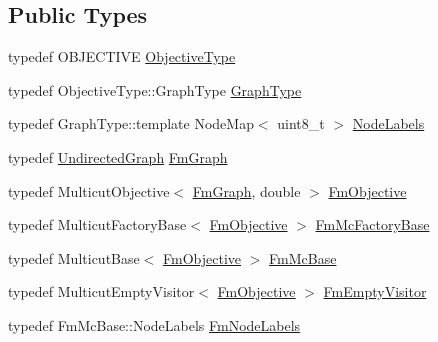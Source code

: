 \subsection*{Public Types}
\begin{DoxyCompactItemize}
\item 
typedef O\+B\+J\+E\+C\+T\+I\+VE \hyperlink{classnifty_1_1graph_1_1opt_1_1common_1_1FusionMove_a8e60c3d0397b2a2b49bdc8f302a65d93}{Objective\+Type}
\item 
typedef Objective\+Type\+::\+Graph\+Type \hyperlink{classnifty_1_1graph_1_1opt_1_1common_1_1FusionMove_ae7d9edd5e5e84cbe25b5732af4c71f93}{Graph\+Type}
\item 
typedef Graph\+Type\+::template Node\+Map$<$ uint8\+\_\+t $>$ \hyperlink{classnifty_1_1graph_1_1opt_1_1common_1_1FusionMove_a256feb2fca79a7cfc9cb82c561f97f64}{Node\+Labels}
\item 
typedef \hyperlink{classnifty_1_1graph_1_1UndirectedGraph}{Undirected\+Graph} \hyperlink{classnifty_1_1graph_1_1opt_1_1common_1_1FusionMove_a0117bf1dc4f03da949dea05ba953c78e}{Fm\+Graph}
\item 
typedef Multicut\+Objective$<$ \hyperlink{classnifty_1_1graph_1_1opt_1_1common_1_1FusionMove_a0117bf1dc4f03da949dea05ba953c78e}{Fm\+Graph}, double $>$ \hyperlink{classnifty_1_1graph_1_1opt_1_1common_1_1FusionMove_a238d47fabd4bf7f5a923885f9203536c}{Fm\+Objective}
\item 
typedef Multicut\+Factory\+Base$<$ \hyperlink{classnifty_1_1graph_1_1opt_1_1common_1_1FusionMove_a238d47fabd4bf7f5a923885f9203536c}{Fm\+Objective} $>$ \hyperlink{classnifty_1_1graph_1_1opt_1_1common_1_1FusionMove_af50b93c2e6e830750451b8cf05b4b657}{Fm\+Mc\+Factory\+Base}
\item 
typedef Multicut\+Base$<$ \hyperlink{classnifty_1_1graph_1_1opt_1_1common_1_1FusionMove_a238d47fabd4bf7f5a923885f9203536c}{Fm\+Objective} $>$ \hyperlink{classnifty_1_1graph_1_1opt_1_1common_1_1FusionMove_a9826b5a29ee4623ac565519dce446513}{Fm\+Mc\+Base}
\item 
typedef Multicut\+Empty\+Visitor$<$ \hyperlink{classnifty_1_1graph_1_1opt_1_1common_1_1FusionMove_a238d47fabd4bf7f5a923885f9203536c}{Fm\+Objective} $>$ \hyperlink{classnifty_1_1graph_1_1opt_1_1common_1_1FusionMove_a0cf98a9b7c916eb62da979846de0a47d}{Fm\+Empty\+Visitor}
\item 
typedef Fm\+Mc\+Base\+::\+Node\+Labels \hyperlink{classnifty_1_1graph_1_1opt_1_1common_1_1FusionMove_a80565c2d37759eb6129a390468725c94}{Fm\+Node\+Labels}
\end{DoxyCompactItemize}
